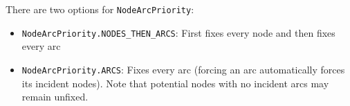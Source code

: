 \documentclass{article}
\begin{document}
There are two options for \texttt{NodeArcPriority}:
\begin{itemize}
\item \texttt{NodeArcPriority.NODES\_THEN\_ARCS}: First fixes every node and then fixes every arc
\item \texttt{NodeArcPriority.ARCS}: Fixes every arc (forcing an arc automatically forces its incident nodes). Note that potential nodes with no incident arcs may remain unfixed. 
\end{itemize}

%
%
%
%
%
%
\end{document}
